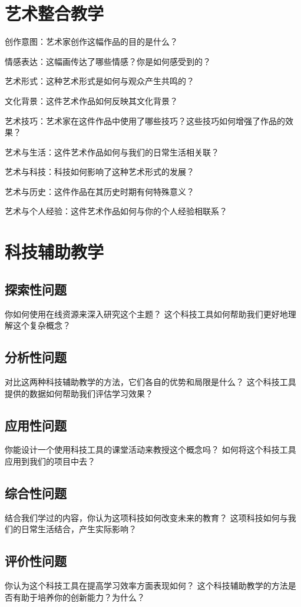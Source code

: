 \documentclass[12pt]{book}
\begin{document}
\section{艺术整合教学}

创作意图：艺术家创作这幅作品的目的是什么？

情感表达：这幅画传达了哪些情感？你是如何感受到的？

艺术形式：这种艺术形式是如何与观众产生共鸣的？

文化背景：这件艺术作品如何反映其文化背景？

艺术技巧：艺术家在这件作品中使用了哪些技巧？这些技巧如何增强了作品的效果？

艺术与生活：这件艺术作品如何与我们的日常生活相关联？

艺术与科技：科技如何影响了这种艺术形式的发展？

艺术与历史：这件作品在其历史时期有何特殊意义？

艺术与个人经验：这件艺术作品如何与你的个人经验相联系？


\section{科技辅助教学}
\subsection{探索性问题}
你如何使用在线资源来深入研究这个主题？
这个科技工具如何帮助我们更好地理解这个复杂概念？

\subsection{分析性问题}
对比这两种科技辅助教学的方法，它们各自的优势和局限是什么？
这个科技工具提供的数据如何帮助我们评估学习效果？

\subsection{应用性问题}
你能设计一个使用科技工具的课堂活动来教授这个概念吗？
如何将这个科技工具应用到我们的项目中去？

\subsection{综合性问题}
结合我们学过的内容，你认为这项科技如何改变未来的教育？
这项科技如何与我们的日常生活结合，产生实际影响？

\subsection{评价性问题}
你认为这个科技工具在提高学习效率方面表现如何？
这个科技辅助教学的方法是否有助于培养你的创新能力？为什么？
\end{document}

